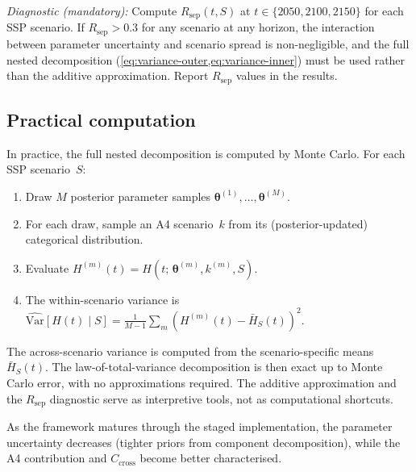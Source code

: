 \documentclass[11pt]{article}
\begin{document}
\emph{Diagnostic (mandatory):} Compute $R_{\text{sep}}(t, S)$ at $t \in \{2050, 2100, 2150\}$ for each SSP scenario.  If $R_{\text{sep}} > 0.3$ for any scenario at any horizon, the interaction between parameter uncertainty and scenario spread is non-negligible, and the full nested decomposition (\cref{eq:variance-outer,eq:variance-inner}) must be used rather than the additive approximation.  Report $R_{\text{sep}}$ values in the results.

\subsection{Practical computation}

In practice, the full nested decomposition is computed by Monte Carlo.  For each SSP scenario~$S$:
\begin{enumerate}
  \item Draw $M$ posterior parameter samples $\boldsymbol{\theta}^{(1)}, \ldots, \boldsymbol{\theta}^{(M)}$.
  \item For each draw, sample an A4 scenario~$k$ from its (posterior-updated) categorical distribution.
  \item Evaluate $H^{(m)}(t) = H(t;\, \boldsymbol{\theta}^{(m)}, k^{(m)}, S)$.
  \item The within-scenario variance is $\widehat{\text{Var}}[H(t) \mid S] = \frac{1}{M-1}\sum_m \left(H^{(m)}(t) - \bar{H}_S(t)\right)^2$.
\end{enumerate}
The across-scenario variance is computed from the scenario-specific means $\bar{H}_S(t)$.  The law-of-total-variance decomposition is then exact up to Monte Carlo error, with no approximations required.  The additive approximation and the $R_{\text{sep}}$ diagnostic serve as interpretive tools, not as computational shortcuts.

As the framework matures through the staged implementation, the parameter uncertainty decreases (tighter priors from component decomposition), while the A4 contribution and $C_{\text{cross}}$ become better characterised.
\end{document}
